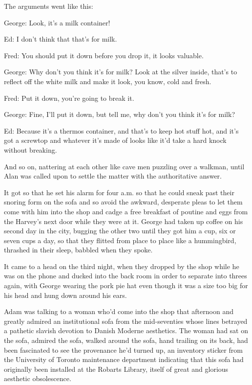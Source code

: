 The arguments went like this:

George:  Look, it's a milk container!

Ed:  I don't think that that's for milk.

Fred:  You should put it down before you drop it, it looks valuable.

George:  Why don't you think it's for milk?  Look at the silver
inside, that's to reflect off the white milk and make it look, you
know, cold and fresh.

Fred:  Put it down, you're going to break it.

George:  Fine, I'll put it down, but tell me, why don't you think it's
for milk?

Ed:  Because it's a thermos container, and that's to keep hot stuff
hot, and it's got a screwtop and whatever it's made of looks like it'd
take a hard knock without breaking.

And so on, nattering at each other like cave men puzzling over a
walkman, until Alan was called upon to settle the matter with the
authoritative answer.

It got so that he set his alarm for four a.m.  so that he could sneak
past their snoring form on the sofa and so avoid the awkward,
desperate pleas to let them come with him into the shop and cadge a
free breakfast of poutine and eggs from the Harvey's next door while
they were at it.  George had taken up coffee on his second day in the
city, bugging the other two until they got him a cup, six or seven
cups a day, so that they flitted from place to place like a
hummingbird, thrashed in their sleep, babbled when they spoke.

It came to a head on the third night, when they dropped by the shop
while he was on the phone and ducked into the back room in order to
separate into threes again, with George wearing the pork pie hat even
though it was a size too big for his head and hung down around his
ears.

Adam was talking to a woman who'd come into the shop that afternoon
and greatly admired an institutional sofa from the mid-seventies whose
lines betrayed a pathetic slavish devotion to Danish Moderne
aesthetics.  The woman had sat on the sofa, admired the sofa, walked
around the sofa, hand trailing on its back, had been fascinated to see
the provenance he'd turned up, an inventory sticker from the
University of Toronto maintenance department indicating that this sofa
had originally been installed at the Robarts Library, itself of great
and glorious aesthetic obsolescence.

